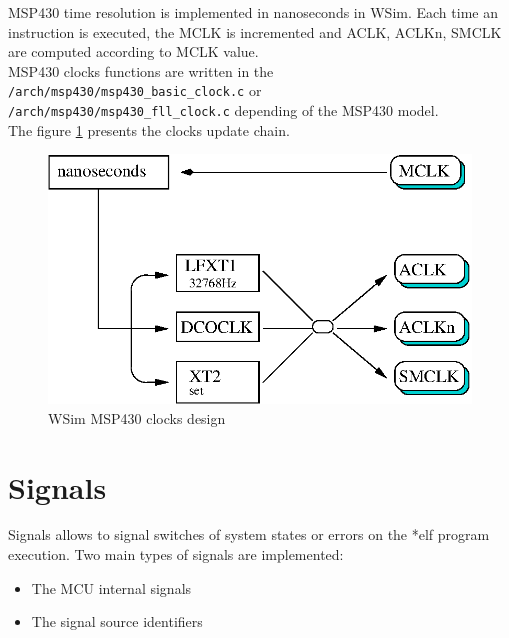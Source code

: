 \documentclass[a4paper,10pt]{report}
\begin{document}
MSP430 time resolution is implemented in nanoseconds in WSim. Each time an instruction is executed, the MCLK is incremented and ACLK, ACLKn, SMCLK are computed according to MCLK value.\\

MSP430 clocks functions are written in the \verb$/arch/msp430/msp430_basic_clock.c$ or\\ \verb$/arch/msp430/msp430_fll_clock.c$ depending of the MSP430 model.\\

The figure \ref{wsim-clocks} presents the clocks update chain.

\begin{figure}[!h]
\begin{center}
  \includegraphics[scale=0.9]{figures/wsim_clocks.eps}
\end{center}
\caption{WSim MSP430 clocks design}
\label{wsim-clocks}
\end{figure}




\section{Signals}
Signals allows to signal switches of system states or errors on the *elf program execution. Two main types of signals are implemented:
\begin{itemize}
  \item The MCU internal signals
  \item The signal source identifiers
\end{itemize}
\end{document}
